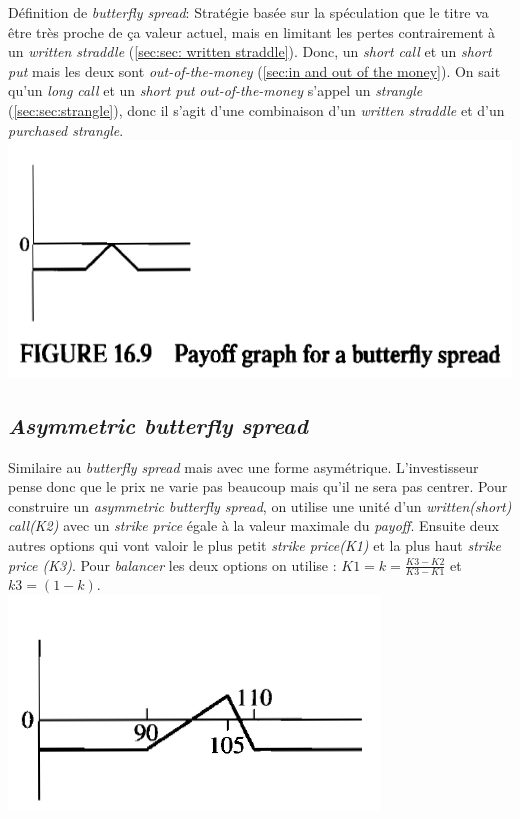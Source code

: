 \documentclass[11pt,french]{report}
\begin{document}
Définition de \emph{butterfly spread}: Stratégie basée sur la spéculation que le titre va être très proche de ça valeur actuel, mais en limitant les pertes contrairement à un \emph{written straddle} (\ref{sec:sec: written straddle}). Donc, un \emph{short call} et un \emph{short put} mais les deux sont \emph{out-of-the-money} (\ref{sec:in and out of the money}). On sait qu'un \emph{long call} et un \emph{short put} \emph{out-of-the-money} s'appel un \emph{strangle} (\ref{sec:sec:strangle}), donc il s'agit d'une combinaison d'un \emph{written straddle} et d'un \emph{purchased strangle}. 
\\
\includegraphics[scale=0.45]{picture30.PNG}


\subsection{\emph{Asymmetric butterfly spread}}
\label{sec:sec:asymmetric butterfly spread}

Similaire au \emph{butterfly spread} mais avec une forme asymétrique. L'investisseur pense donc que le prix ne varie pas beaucoup mais qu'il ne sera pas centrer. Pour construire un \emph{asymmetric butterfly spread}, on utilise une unité d'un \emph{written(short) call(K2)} avec un \emph{strike price} égale à la valeur maximale du \emph{payoff}. Ensuite deux autres options qui vont valoir le plus petit \emph{strike price(K1)} et la plus haut \emph{strike price (K3)}. Pour \textit{balancer} les deux options on utilise : $ K1 = k = \frac{K3 - K2}{K3-K1}$ et $ k3 = (1 -k)$.
\\
\includegraphics[scale=0.45]{picture31.PNG}
\end{document}
